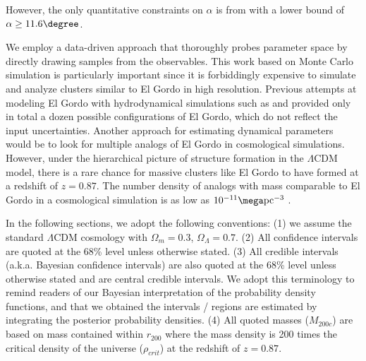 However, the only quantitative constraints on $\alpha$ is from \cite{L13}
with a lower bound of $\alpha \geq 11.6 \degree$.  
\par 
We employ a data-driven approach that thoroughly probes parameter
space by directly drawing samples from the observables. 
This work based on Monte Carlo simulation is particularly important since
it is forbiddingly expensive to simulate and analyze clusters similar to El
Gordo in high resolution. Previous attempts at modeling El Gordo with hydrodynamical
simulations such as \cite{Donnert13} and \cite{Molnar14} provided only in
total a dozen possible configurations of El Gordo, which do not
reflect the input uncertainties. Another approach for
estimating dynamical parameters would be to look for multiple analogs of El Gordo in cosmological
simulations.  However, under the hierarchical picture
of structure formation in the $\Lambda$CDM model, there is a rare chance
for massive clusters like El Gordo to have formed at a redshift of $z = 0.87$.  
The number density of analogs with mass comparable to El Gordo in a
cosmological simulation is as low as $10^{-11} \mega\text{pc}^{-3}$ .  
\par
In the following sections, we adopt the following conventions: (1) we
assume the standard $\Lambda$CDM cosmology with $\Omega_{m} = 0.3$, $\Omega_{\Lambda} = 0.7$. (2) All confidence intervals are quoted at the 68\% level unless otherwise stated. 
(3) All credible intervals (a.k.a. Bayesian confidence intervals) are also
quoted at the 68\% level unless otherwise stated and are central credible
intervals. We adopt this terminology to remind readers of our Bayesian
interpretation of the probability density functions, and that we obtained
the intervals / regions are estimated by integrating the posterior
probability densities.  
(4) All quoted masses ($M_{200c}$) are based on mass contained
within $r_{200}$ where the mass density is 200 times the critical density
of the universe ($\rho_{crit}$) at the redshift of $z = 0.87$. 
